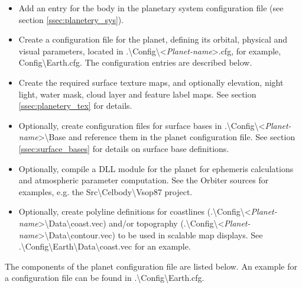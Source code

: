 \documentclass[Orbiter Developer Manual.tex]{subfiles}
\begin{document}
\begin{itemize}
\item Add an entry for the body in the planetary system configuration file (see section \ref{ssec:planetery_sys}).
\item Create a configuration file for the planet, defining its orbital, physical and visual parameters, located in .\textbackslash Config\textbackslash <\textit{Planet-name}>.cfg, for example, Config\textbackslash Earth.cfg. The configuration entries are described below.
\item Create the required surface texture maps, and optionally elevation, night light, water mask, cloud layer and feature label maps. See section \ref{ssec:planetery_tex} for details.
\item Optionally, create configuration files for surface bases in .\textbackslash Config\textbackslash <\textit{Planet-name}>\textbackslash Base and reference them in the planet configuration file. See section \ref{ssec:surface_bases} for details on surface base definitions.
\item Optionally, compile a DLL module for the planet for ephemeris calculations and atmospheric parameter computation. See the Orbiter sources for examples, e.g. the Src\textbackslash Celbody\textbackslash Vsop87 project.
\item Optionally, create polyline definitions for coastlines (.\textbackslash Config\textbackslash <\textit{Planet-name}>\textbackslash Data\textbackslash coast.vec) and/or topography (.\textbackslash Config\textbackslash <\textit{Planet-name}>\textbackslash Data\textbackslash contour.vec) to be used in scalable map displays. See .\textbackslash Config\textbackslash Earth\textbackslash Data\textbackslash coast.vec for an example.
\end{itemize}

\noindent
The components of the planet configuration file are listed below. An example for a configuration file can be found in .\textbackslash Config\textbackslash Earth.cfg.
\end{document}
